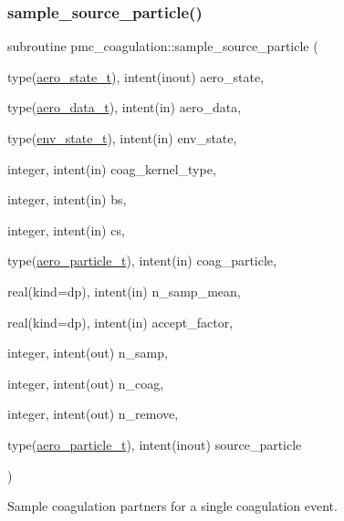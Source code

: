 \subsubsection{\texorpdfstring{sample\+\_\+source\+\_\+particle()}{sample\_source\_particle()}}
{\footnotesize\ttfamily subroutine pmc\+\_\+coagulation\+::sample\+\_\+source\+\_\+particle (\begin{DoxyParamCaption}\item[{type(\mbox{\hyperlink{structpmc__aero__state_1_1aero__state__t}{aero\+\_\+state\+\_\+t}}), intent(inout)}]{aero\+\_\+state,  }\item[{type(\mbox{\hyperlink{structpmc__aero__data_1_1aero__data__t}{aero\+\_\+data\+\_\+t}}), intent(in)}]{aero\+\_\+data,  }\item[{type(\mbox{\hyperlink{structpmc__env__state_1_1env__state__t}{env\+\_\+state\+\_\+t}}), intent(in)}]{env\+\_\+state,  }\item[{integer, intent(in)}]{coag\+\_\+kernel\+\_\+type,  }\item[{integer, intent(in)}]{bs,  }\item[{integer, intent(in)}]{cs,  }\item[{type(\mbox{\hyperlink{structpmc__aero__particle_1_1aero__particle__t}{aero\+\_\+particle\+\_\+t}}), intent(in)}]{coag\+\_\+particle,  }\item[{real(kind=dp), intent(in)}]{n\+\_\+samp\+\_\+mean,  }\item[{real(kind=dp), intent(in)}]{accept\+\_\+factor,  }\item[{integer, intent(out)}]{n\+\_\+samp,  }\item[{integer, intent(out)}]{n\+\_\+coag,  }\item[{integer, intent(out)}]{n\+\_\+remove,  }\item[{type(\mbox{\hyperlink{structpmc__aero__particle_1_1aero__particle__t}{aero\+\_\+particle\+\_\+t}}), intent(inout)}]{source\+\_\+particle }\end{DoxyParamCaption})}



Sample coagulation partners for a single coagulation event. 


